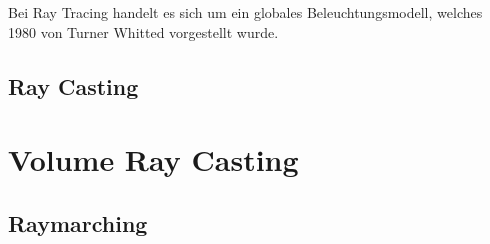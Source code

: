 Bei Ray Tracing handelt es sich um ein globales Beleuchtungsmodell, welches 1980 von Turner Whitted vorgestellt wurde.

\subsection{Ray Casting}
\label{subsec:ray_casting}


\section{Volume Ray Casting}
\label{sec:volume_ray_casting}


\subsection{Raymarching}
\label{subsec:raymarching}

